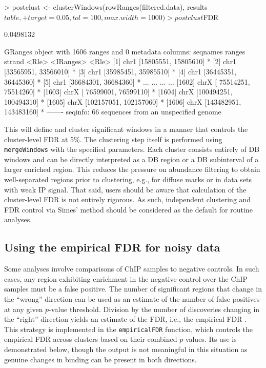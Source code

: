 \documentclass[12pt]{report}
\renewenvironment{Schunk}{\vspace{0pt}}{\vspace{0pt}}
\newcommand{\code}[1]{{\small\texttt{#1}}}
\begin{document}
\begin{Schunk}
\begin{Sinput}
> postclust <- clusterWindows(rowRanges(filtered.data), results$table,
+     target=0.05, tol=100, max.width=1000)
> postclust$FDR
\end{Sinput}
\begin{Soutput}
[1] 0.0498132
\end{Soutput}
\begin{Soutput}
GRanges object with 1606 ranges and 0 metadata columns:
         seqnames                 ranges strand
            <Rle>              <IRanges>  <Rle>
     [1]     chr1   [15805551, 15805610]      *
     [2]     chr1   [33565951, 33566010]      *
     [3]     chr1   [35985451, 35985510]      *
     [4]     chr1   [36445351, 36445360]      *
     [5]     chr1   [36684301, 36684360]      *
     ...      ...                    ...    ...
  [1602]     chrX [ 75514251,  75514260]      *
  [1603]     chrX [ 76599001,  76599110]      *
  [1604]     chrX [100494251, 100494310]      *
  [1605]     chrX [102157051, 102157060]      *
  [1606]     chrX [143482951, 143483160]      *
  -------
  seqinfo: 66 sequences from an unspecified genome
\end{Soutput}
\end{Schunk}

This will define and cluster significant windows in a manner that controls the cluster-level FDR at 5\%.
The clustering step itself is performed using \code{mergeWindows} with the specified parameters.
Each cluster consists entirely of DB windows and can be directly interpreted as a DB region or a DB subinterval of a larger enriched region.
This reduces the pressure on abundance filtering to obtain well-separated regions prior to clustering, e.g., for diffuse marks or in data sets with weak IP signal.
That said, users should be aware that calculation of the cluster-level FDR is not entirely rigorous.
As such, independent clustering and FDR control via Simes' method should be considered as the default for routine analyses.

\subsection{Using the empirical FDR for noisy data}
Some analyses involve comparisons of ChIP samples to negative controls.
In such cases, any region exhibiting enrichment in the negative control over the ChIP samples must be a false positive.
The number of significant regions that change in the ``wrong'' direction can be used as an estimate of the number of false positives at any given $p$-value threshold.
Division by the number of discoveries changing in the ``right'' direction yields an estimate of the FDR, i.e., the empirical FDR \citep{zhang2008}.
This strategy is implemented in the \code{empiricalFDR} function, which controls the empirical FDR across clusters based on their combined $p$-values.
Its use is demonstrated below, though the output is not meaningful in this situation as genuine changes in binding can be present in both directions.
\end{document}
